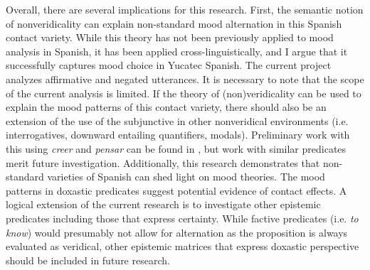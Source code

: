 \documentclass[output=paper,colorlinks,citecolor=brown,
]{langscibook}
\begin{document}
Overall, there are several implications for this research. First, the semantic notion of nonveridicality can explain non-standard mood alternation in this Spanish contact variety. While this theory has not been previously applied to mood analysis in Spanish, it has been applied cross-linguistically, and I argue that it successfully captures mood choice in Yucatec Spanish. The current project analyzes affirmative and negated utterances. It is necessary to note that the scope of the current analysis is limited. If the theory of (non)veridicality can be used to explain the mood patterns of this contact variety, there should also be an extension of the use of the subjunctive in other nonveridical environments (i.e. interrogatives, downward entailing quantifiers, modals). Preliminary work with this using \textit{creer} and \textit{pensar} can be found in \citet{Bove2020}, but work with similar predicates merit future investigation. Additionally, this research demonstrates that non-standard varieties of Spanish can shed light on mood theories. The mood patterns in doxastic predicates suggest potential evidence of contact effects. A logical extension of the current research is to investigate other epistemic predicates including those that express certainty. While factive predicates (i.e. \textit{to know}) would presumably not allow for alternation as the proposition is always evaluated as veridical, other epistemic matrices that express doxastic perspective should be included in future research. 

\printbibliography[heading=subbibliography,notkeyword=this]
\end{document}
